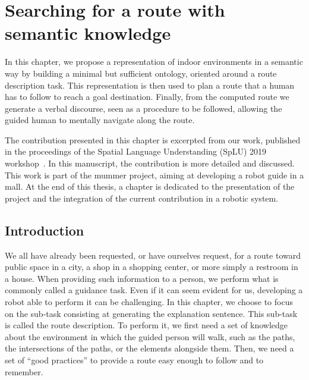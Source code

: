\ifdefined{}
\else
\setcounter{chapter}{3} %
\dominitoc
\faketableofcontents
\fi

\chapter{Searching for a route with semantic knowledge}
\label{chap:3}
\minitoc

In this chapter, we propose a representation of indoor environments in a semantic way by building a minimal but sufficient ontology, oriented around a route description task. This representation is then used to plan a route that a human has to follow to reach a goal destination. Finally, from the computed route we generate a verbal discourse, seen as a procedure to be followed, allowing the guided human to mentally navigate along the route.

The contribution presented in this chapter is excerpted from our work, published in the proceedings of the Spatial Language Understanding (SpLU) 2019 workshop~\cite{sarthou_2019_semantic}. In this manuscript, the contribution is more detailed and discussed. This work is part of the \acrshort{mummer} project, aiming at developing a robot guide in a mall. At the end of this thesis, a chapter is dedicated to the presentation of the project and the integration of the current contribution in a robotic system.

\section{Introduction}

We all have already been requested, or have ourselves request, for a route toward public space in a city, a shop in a shopping center, or more simply a restroom in a house. When providing such information to a person, we perform what is commonly called a guidance task. Even if it can seem evident for us, developing a robot able to perform it can be challenging. In this chapter, we choose to focus on the sub-task consisting at generating the explanation sentence. This sub-task is called the route description. To perform it, we first need a set of knowledge about the environment in which the guided person will walk, such as the paths, the intersections of the paths, or the elements alongside them. Then, we need a set of ``good practices'' to provide a route easy enough to follow and to remember.

